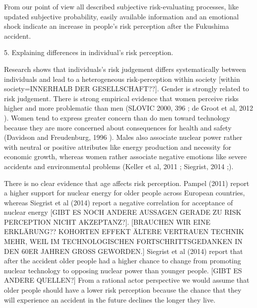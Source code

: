 From our point of view all described subjective risk-evaluating processes, like updated subjective probability, easily available information and an emotional shock indicate an increase in people's risk perception after the Fukushima accident. 



     
5. Explaining differences in individual's risk perception. 

Research shows that  individuals's risk judgement differs systematically between individuals and lead to a heterogeneous risk-perception within society [within society=INNERHALB DER GESELLSCHAFT??]. Gender is strongly related to risk judgement. There is strong empirical evidence that women perceive risks higher and more problematic than men (SLOVIC 2000, 396 \citep[396]{Slovic:2000tx}; de Groot et al, 2012 \citep{deGroot:2012fg}). Women tend to express greater concern than do men toward technology because they are more concerned about consequences for health and safety (Davidson and Freudenburg, 1996 \citep{Davidson:1996uk}).  Males also associate nuclear power rather with neutral or positive attributes like energy production and necessity for economic growth, whereas women rather associate negative emotions like severe accidents and environmental problems (Keller et al, 2011 \citep{Keller:2011gb}; Siegrist, 2014 \citep{Siegrist:2014ji};).  

There is no clear evidence that age affects risk perception. Pampel (2011) \citep{Pampel:2011cx} report a higher support for nuclear energy for older people across European countries, whereas Siegrist et al (2014) report a negative correlation for acceptance of nuclear energy [GIBT ES NOCH ANDERE AUSSAGEN GERADE ZU RISK PERCEPTION NICHT AKZEPTANZ?]. [BRAUCHEN WIR EINE ERKLÄRUNG?? KOHORTEN EFFEKT ÄLTERE VERTRAUEN TECHNIK MEHR, WEIL IM TECHNOLOGISCHEN FORTSCHRITTSGEDANKEN IN DEN 60ER JAHREN GROSS GEWORDEN.] Siegrist et al (2014) \citep{Siegrist:2014ji} report that after the accident older people had a higher chance to change from promoting nuclear technology to opposing nuclear power than younger people.  [GIBT ES ANDERE QUELLEN?] From a rational actor perspective we would assume that older people should have a lower risk perception because the chance that they will experience an accident in the future declines the longer they live. 
                      
